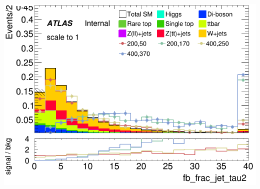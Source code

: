 \documentclass[usenames,dvipsnames]{beamer}
\begin{document}
\begin{frame}
\begin{minipage}{0.32\textwidth}
        \includegraphics[width=\textwidth]{graphics/LH_met_sig/LH_fb_frac_jet_tau2_norm.png}
    \end{minipage}	
\end{frame}
\end{document}
